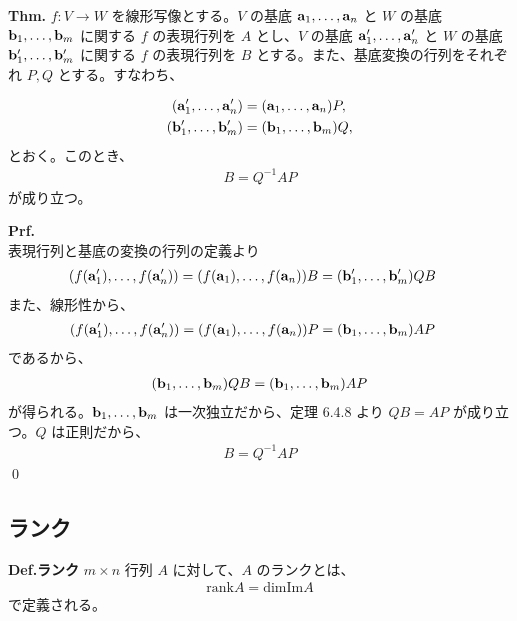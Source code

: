 \documentclass[a4paper,11pt]{jsarticle}
\numberwithin{equation}{section}
\begin{document}
\begin{itembox}[l]{\textbf{Thm.}}
  $f: V \to W$ を線形写像とする。$V$ の基底 $\vb{a}_1, \dots, \vb{a}_n$ と $W$ の基底 $\vb{b}_1, \dots, \vb{b}_m$ に関する $f$ の表現行列を $A$ とし、$V$ の基底 $\vb{a}_1', \dots, \vb{a}_n'$ と $W$ の基底 $\vb{b}_1', \dots, \vb{b}_m'$ に関する $f$ の表現行列を $B$ とする。また、基底変換の行列をそれぞれ $P, Q$ とする。すなわち、
  
  \begin{align}
      (\vb{a}_1', \dots, \vb{a}_n') &= (\vb{a}_1, \dots, \vb{a}_n) P, \\
      (\vb{b}_1', \dots, \vb{b}_m') &= (\vb{b}_1, \dots, \vb{b}_m) Q,
  \end{align}
  とおく。このとき、
  \begin{align}
  B = Q^{-1} A P
  \end{align}
  が成り立つ。
  \end{itembox}
  \textbf{Prf.}\\
  表現行列と基底の変換の行列の定義より
  \begin{align}
  (f(\vb{a}_1'), \dots, f(\vb{a}_n')) &= (f(\vb{a}_1), \dots, f(\vb{a}_n)) B = (\vb{b}_1', \dots, \vb{b}_m') QB
  \end{align}
  また、線形性から、
  \begin{align}
  (f(\vb{a}_1'), \dots, f(\vb{a}_n')) &= (f(\vb{a}_1), \dots, f(\vb{a}_n)) P = (\vb{b}_1, \dots, \vb{b}_m) AP
  \end{align}
  であるから、
  \begin{align}
  (\vb{b}_1, \dots, \vb{b}_m) QB = (\vb{b}_1, \dots, \vb{b}_m) AP
  \end{align}
  が得られる。$\vb{b}_1, \dots, \vb{b}_m$ は一次独立だから、定理 6.4.8 より $QB = AP$ が成り立つ。$Q$ は正則だから、
  \begin{align}
  B = Q^{-1} A P
  \end{align}
\qed

\subsection{ランク}
\begin{itembox}[l]{\textbf{Def.ランク}}
    $m \times n$ 行列 $A$ に対して、$A$ のランクとは、
    \begin{align}
        \text{rank} A = \text{dim} \text{Im} A
    \end{align}
    で定義される。
\end{itembox}
\end{document}
